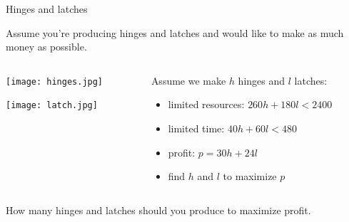 \begin{frame}{Hinges and latches}

\pause Assume you're producing hinges and latches and would like to make as much money as possible.

\begin{columns}

 \begin{column}{0.4\linewidth}

\texttt{[image: hinges.jpg]}

\texttt{[image: latch.jpg]}

 \end{column}
 \begin{column}{0.5\linewidth}
 Assume we make $h$ hinges and $l$ latches:
  \begin{itemize}
\pause\item limited resources: $260h + 180l < 2400$

\pause\item limited time: $40h + 60l < 480$

\pause \item profit: $p = 30h + 24l$

\pause \item find $h$ and $l$ to maximize $p$
  \end{itemize}
 \end{column}
\end{columns}
\pause \vspace{20pt}

How many hinges and latches should you produce to maximize profit.

\end{frame}


